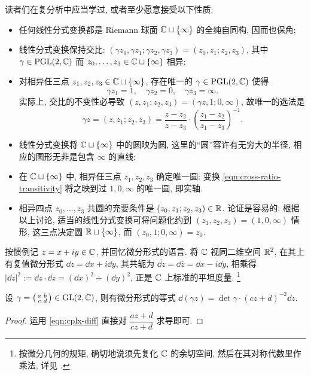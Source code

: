 读者们在复分析中应当学过, 或者至少愿意接受以下性质:
\begin{itemize}
	\item 任何线性分式变换都是 Riemann 球面 $\mathbb{C} \sqcup \{\infty\}$ 的全纯自同构, 因而也保角;
	\item 线性分式变换保持交比: $(\gamma z_0, \gamma z_1; \gamma z_2, \gamma z_3) = (z_0, z_1; z_2, z_3)$, 其中 $\gamma \in \operatorname{PGL}(2,\mathbb{C})$ 而 $z_0, \ldots, z_3 \in \mathbb{C} \sqcup \{\infty\}$ 相异;
	\item 对相异任三点 $z_1, z_2, z_3 \in \mathbb{C} \sqcup \{\infty\}$, 存在唯一的 $\gamma \in \operatorname{PGL}(2,\mathbb{C})$ 使得
	\[ \gamma z_1 = 1, \quad \gamma z_2 = 0, \quad \gamma z_3 = \infty. \]
	实际上, 交比的不变性必导致 $(z, z_1; z_2, z_3) = (\gamma z, 1; 0, \infty)$, 故唯一的选法是
	\begin{equation}\label{eqn:cross-ratio-transitivity}
		\gamma z = (z, z_1; z_2, z_3) = \frac{z - z_2}{z - z_3} \cdot \left(\frac{z_1 - z_2}{z_1 - z_3}\right)^{-1}.
	\end{equation}
	\item 线性分式变换将 $\mathbb{C} \sqcup \{\infty\}$ 中的圆映为圆, 这里的``圆''容许有无穷大的半径, 相应的图形无非是包含 $\infty$ 的直线;
	\item 在 $\mathbb{C} \sqcup \{\infty\}$ 中, 相异任三点 $z_1, z_2, z_3$ 确定唯一圆: 变换 \eqref{eqn:cross-ratio-transitivity} 将之映到过 $1,0,\infty$ 的唯一圆, 即实轴. 
	\item 相异四点 $z_0, \ldots, z_3$ 共圆的充要条件是 $(z_0, z_1; z_2, z_3) \in \mathbb{R}$. 论证是容易的: 根据以上讨论, 适当的线性分式变换可将问题化约到 $(z_1, z_2, z_3) = (1, 0, \infty)$ 情形, 这三点决定圆 $\mathbb{R} \sqcup \{\infty\}$, 而 $(z_0, 1; 0, \infty) = z_0$.
\end{itemize}

按惯例记 $z = x + iy \in \mathbb{C}$, 并回忆微分形式的语言. 将 $\mathbb{C}$ 视同二维空间 $\mathbb{R}^2$, 在其上有复值微分形式 $\dd z = \dd x + i\dd y$, 其共轭为 $\overline{\dd z} = \dd\bar{z} = \dd x - i\dd y$, 相乘得 $|\dd z|^2 := \dd z \cdot \overline{\dd z} = (\dd x)^2 + (\dd y)^2$, 正是 $\mathbb{C}$ 上标准的平坦度量.
\footnote{按微分几何的规矩, 确切地说须先复化 $\mathbb{C}$ 的余切空间, 然后在其对称代数里作乘法, 详见 \cite[\S 7.6]{Li1}.}

\begin{lemma}\label{prop:fractional-transform-d}
	设 $\gamma = \bigl( \begin{smallmatrix} a & b \\ c & d \end{smallmatrix} \bigr) \in \operatorname{GL}(2,\mathbb{C})$, 则有微分形式的等式 $\dd(\gamma z) = \det\gamma \cdot (cz+d)^{-2} \dd z$.
\end{lemma}
\begin{proof}
	运用 \eqref{eqn:cplx-diff} 直接对 $\dfrac{az+d}{cz+d}$ 求导即可.
\end{proof}

